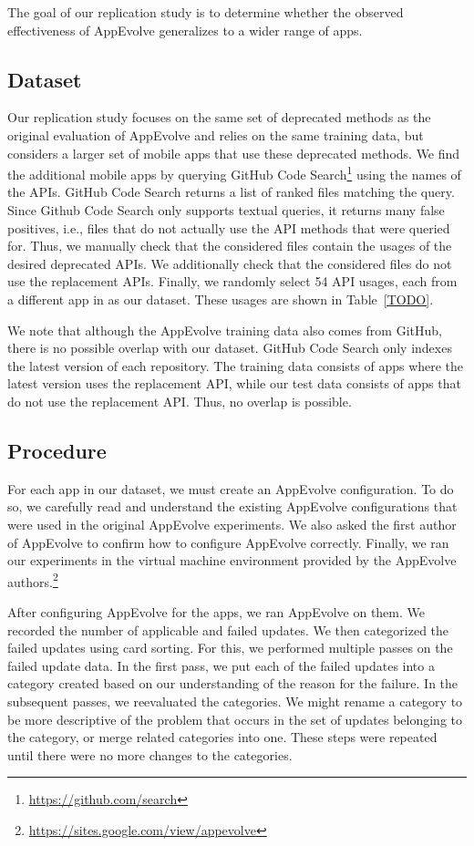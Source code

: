 The goal of our replication study is to determine whether the observed
effectiveness of AppEvolve generalizes to a wider range of apps.

\subsection{Dataset}
Our replication study focuses on the same set of deprecated methods as the
original evaluation of AppEvolve and relies on the same training data, but
considers a larger set of mobile apps that use these deprecated methods.
We find the additional mobile apps by querying GitHub Code
Search\footnote{\url{https://github.com/search}} using the names of the
APIs. GitHub Code Search returns a list of ranked files matching the
query. Since Github Code Search only supports textual queries, it returns
many false positives, i.e., files that do not actually use the API methods
that were queried for.  Thus, we manually check that the considered files
contain the usages of the desired deprecated APIs.  We additionally check
that the considered files do not use the replacement APIs. Finally, we
randomly select 54 API usages, each from a different app in as our
dataset.  These usages are shown in Table~\ref{TODO}.

We note that although the AppEvolve training data also comes from GitHub,
there is no possible overlap with our dataset.  GitHub Code Search only
indexes the latest version of each repository.  The training data consists
of apps where the latest version uses the replacement API, while our test
data consists of apps that do not use the replacement API.  Thus, no
overlap is possible.

\subsection{Procedure}
For each app in our dataset, we must create an AppEvolve configuration. To
do so, we carefully read and understand the existing AppEvolve
configurations that were used in the original AppEvolve experiments. We
also asked the first author of AppEvolve to confirm how to configure
AppEvolve correctly. Finally, we ran our experiments in the virtual machine
environment provided by the AppEvolve
authors.\footnote{\url{https://sites.google.com/view/appevolve}}

After configuring AppEvolve for the apps, we ran AppEvolve on them. We
recorded the number of applicable and failed updates. We then categorized
the failed updates using card sorting\cite{...}. For this, we performed
multiple passes on the failed update data. In the first pass, we put each
of the failed updates into a category created based on our understanding of
the reason for the failure. In the subsequent passes, we reevaluated the
categories. We might rename a category to be more descriptive of the
problem that occurs in the set of updates belonging to the category, or
merge related categories into one. These steps were repeated until there
were no more changes to the categories.
